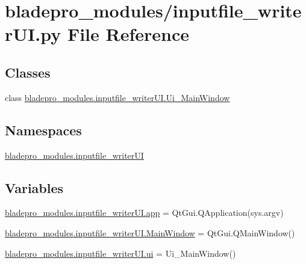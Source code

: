 \hypertarget{a00008}{}\section{bladepro\+\_\+modules/inputfile\+\_\+writer\+UI.py File Reference}
\label{a00008}
\subsection*{Classes}
\begin{DoxyCompactItemize}
\item 
class \hyperlink{a00074}{bladepro\+\_\+modules.\+inputfile\+\_\+writer\+U\+I.\+Ui\+\_\+\+Main\+Window}
\end{DoxyCompactItemize}
\subsection*{Namespaces}
\begin{DoxyCompactItemize}
\item 
 \hyperlink{a00049}{bladepro\+\_\+modules.\+inputfile\+\_\+writer\+UI}
\end{DoxyCompactItemize}
\subsection*{Variables}
\begin{DoxyCompactItemize}
\item 
\hyperlink{a00049_abb2f696d468ab34ad27b9d0c256b8e72}{bladepro\+\_\+modules.\+inputfile\+\_\+writer\+U\+I.\+app} = Qt\+Gui.\+Q\+Application(sys.\+argv)
\item 
\hyperlink{a00049_ab649489a40967421c06970ba9ffeef53}{bladepro\+\_\+modules.\+inputfile\+\_\+writer\+U\+I.\+Main\+Window} = Qt\+Gui.\+Q\+Main\+Window()
\item 
\hyperlink{a00049_ad10cb13360f604c82c202259b73f747b}{bladepro\+\_\+modules.\+inputfile\+\_\+writer\+U\+I.\+ui} = Ui\+\_\+\+Main\+Window()
\end{DoxyCompactItemize}
